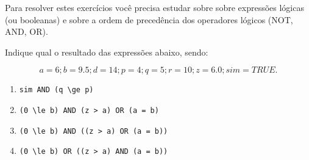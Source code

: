   Para resolver estes exercícios
  você precisa estudar sobre sobre expressões lógicas (ou booleanas) e sobre a 
  ordem de precedência dos operadores lógicos (NOT, AND, OR).


\item Indique qual o resultado das expressões abaixo, sendo: 

\[
  a=6; b=9.5; d=14; p=4; q=5; r=10; z=6.0 ; sim= TRUE.
\]

\begin {enumerate}
\item \verb|sim AND (q \ge p)|
\item \verb|(0 \le b) AND (z > a) OR (a = b)|
\item \verb|(0 \le b) AND ((z > a) OR (a = b))|
\item \verb|(0 \le b) OR ((z > a) AND (a = b))|
\end {enumerate}


